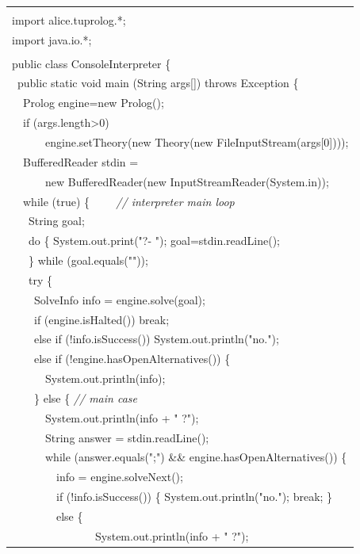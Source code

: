 \begin{table}
    \small
    \begin{center}{\tt
    \begin{tabular}{p{14cm}}\hline\\
    import alice.tuprolog.*;\\
    import java.io.*;\\
    \\
    public class ConsoleInterpreter  \{\\
    ~public static void main (String args[]) throws Exception \{\\
    ~~Prolog engine=new Prolog();\\
    ~~if (args.length>0)\\
    ~~~~~~engine.setTheory(new Theory(new FileInputStream(args[0])));\\
    ~~BufferedReader stdin =\\
    ~~~~~~new BufferedReader(new InputStreamReader(System.in));\\
    ~~while (true) \{ \textit{~~~~// interpreter main loop} \\
    ~~~String goal;\\
    ~~~do \{ System.out.print("?- "); goal=stdin.readLine();\\
    ~~~\} while (goal.equals(""));\\
    ~~~try \{\\
    ~~~~SolveInfo info = engine.solve(goal);\\
    ~~~~if (engine.isHalted()) break;\\
    ~~~~else if (!info.isSuccess()) System.out.println("no.");\\
    ~~~~else if (!engine.hasOpenAlternatives()) \{\\
    ~~~~~~System.out.println(info);\\
    ~~~~\} else \{ \textit{// main case}\\
    ~~~~~~System.out.println(info + " ?");\\
    ~~~~~~String answer = stdin.readLine();\\
    ~~~~~~while (answer.equals(";") \&\& engine.hasOpenAlternatives())
    \{\\
    ~~~~~~~~info = engine.solveNext();\\
    ~~~~~~~~if (!info.isSuccess()) \{ System.out.println("no."); break; \}\\
    ~~~~~~~~else \{\\
    ~~~~~~~~~~~~~~~System.out.println(info + " ?");\\

\end{tabular}}
\end{center}
\end{table}
